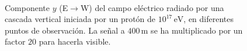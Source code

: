 \documentclass[12 pt, a4paper]{article} %
\numberwithin{equation}{section}
\numberwithin{figure}{section}
\numberwithin{table}{section}
\begin{document}
\begin{figure}[H]
	\centering
	\\
	\caption{Componente $y$ (E$\rightarrow$W) del campo eléctrico radiado por una cascada vertical iniciada por un protón de $10^{17}\,\mathrm{eV}$, en diferentes puntos de observación. La señal a $400\,\mathrm{m}$ se ha multiplicado por un factor $20$ para hacerla visible.}
	\label{EW_field}
\end{figure}
\end{document}
